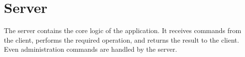 \section{Server}\label{sec:server}

The server contains the core logic of the application. It receives commands from
the client, performs the required operation, and returns the result to the
client. Even administration commands are handled by the server.
